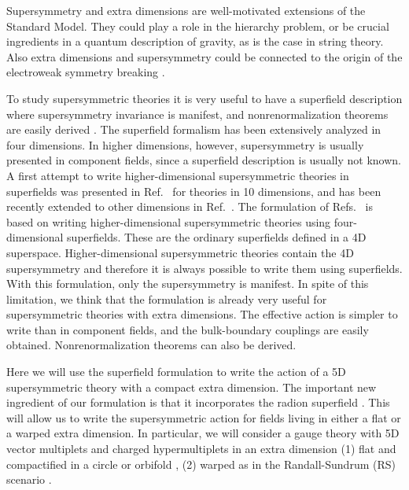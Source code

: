 \documentclass[a4paper,12pt]{article}
\providecommand{\Zparity}{\ensuremath{\mathbb{Z}_2}}
\begin{document}
Supersymmetry and extra dimensions are well-motivated extensions
of the Standard Model.
They could play a role in
 the hierarchy problem, or be crucial ingredients 
in a quantum description of gravity, as is
the case in  string theory. 
Also extra dimensions and supersymmetry could be connected to the origin
of the  electroweak symmetry breaking \cite{ewsb}.



To study  supersymmetric theories it is very useful
to have a  superfield description
where supersymmetry invariance is manifest,
and nonrenormalization theorems are easily derived \cite{wb}.
The \coordHE{} superfield formalism has been extensively analyzed in 
four dimensions.
In  higher dimensions, however,
supersymmetry is usually presented in component fields,
since a superfield description is usually not known.
A first attempt to write  higher-dimensional
supersymmetric theories in superfields
was presented in Ref.~\cite{mss} for  theories  in 10 dimensions,
and  
has  been  recently extended to other dimensions in Ref.~\cite{agw}.
The formulation of Refs.~\cite{mss,agw}   is based  on writing
higher-dimensional supersymmetric theories using  \coordHE{} 
four-dimensional superfields.
These are the ordinary superfields defined in a  4D superspace. 
Higher-dimensional supersymmetric theories contain the 4D supersymmetry
and therefore it is always possible to write them 
using \coordHE{} superfields.
With this formulation, only the \coordHE{} supersymmetry is manifest.
In spite 
of this limitation, we think that the formulation is
already very useful for supersymmetric theories with extra dimensions.
The effective action is  simpler to write than  in component fields,
and the bulk-boundary couplings are easily obtained.
Nonrenormalization theorems can also be derived.


Here we will use the \coordHE{} superfield formulation to
write the action of a 5D supersymmetric theory with 
a compact extra dimension.
The important new ingredient  of our formulation is that 
it incorporates the radion superfield \coordHE{}.
This will allow us   to write the supersymmetric action for fields
living in either  a flat or  a warped extra dimension.
In particular, we will consider a gauge theory with 
 5D vector multiplets and charged hypermultiplets in an
extra dimension 
(1) flat and  compactified 
in a circle \coordHE{} or orbifold \myHighlight{$S^1/\Zparity$}\coordHE{}, 
(2) warped as in the Randall-Sundrum (RS) scenario \cite{rs}.
\end{document}
